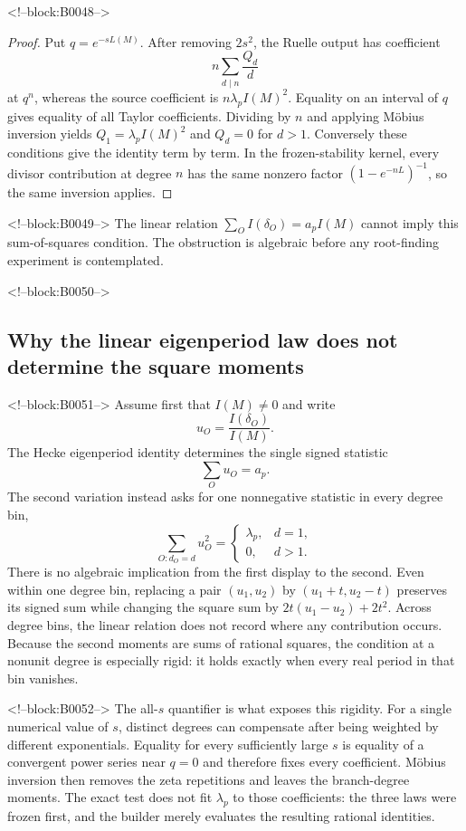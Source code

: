 \documentclass[11pt]{article}
\theoremstyle{definition}
\theoremstyle{remark}
\begin{document}
<!--block:B0048-->
\begin{proof}
Put $q=e^{-sL(M)}$. After removing $2s^2$, the Ruelle output has coefficient
\[
n\sum_{d\mid n}\frac{Q_d}{d}
\]
at $q^n$, whereas the source coefficient is $n\lambda_pI(M)^2$. Equality on an interval of $q$ gives equality of all Taylor coefficients. Dividing by $n$ and applying M\"obius inversion yields $Q_1=\lambda_pI(M)^2$ and $Q_d=0$ for $d>1$. Conversely these conditions give the identity term by term. In the frozen-stability kernel, every divisor contribution at degree $n$ has the same nonzero factor $(1-e^{-nL})^{-1}$, so the same inversion applies.
\end{proof}

<!--block:B0049-->
The linear relation $\sum_OI(\delta_O)=a_pI(M)$ cannot imply this sum-of-squares condition. The obstruction is algebraic before any root-finding experiment is contemplated.

<!--block:B0050-->
\subsection{Why the linear eigenperiod law does not determine the square moments}

<!--block:B0051-->
Assume first that $I(M)\neq0$ and write
\[
u_O=\frac{I(\delta_O)}{I(M)}.
\]
The Hecke eigenperiod identity determines the single signed statistic
\[
\sum_Ou_O=a_p.
\]
The second variation instead asks for one nonnegative statistic in every degree bin,
\[
\sum_{O:d_O=d}u_O^2=
\begin{cases}
\lambda_p,&d=1,\\
0,&d>1.
\end{cases}
\]
There is no algebraic implication from the first display to the second. Even within one degree bin, replacing a pair $(u_1,u_2)$ by $(u_1+t,u_2-t)$ preserves its signed sum while changing the square sum by $2t(u_1-u_2)+2t^2$. Across degree bins, the linear relation does not record where any contribution occurs. Because the second moments are sums of rational squares, the condition at a nonunit degree is especially rigid: it holds exactly when every real period in that bin vanishes.

<!--block:B0052-->
The all-$s$ quantifier is what exposes this rigidity. For a single numerical value of $s$, distinct degrees can compensate after being weighted by different exponentials. Equality for every sufficiently large $s$ is equality of a convergent power series near $q=0$ and therefore fixes every coefficient. M\"obius inversion then removes the zeta repetitions and leaves the branch-degree moments. The exact test does not fit $\lambda_p$ to those coefficients: the three laws were frozen first, and the builder merely evaluates the resulting rational identities.
\end{document}

